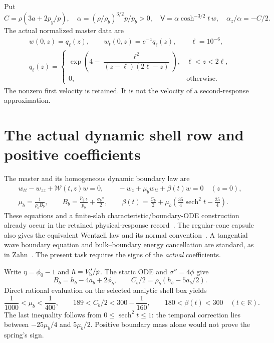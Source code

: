 \documentclass[11pt]{article}
\begin{document}
Put
\begin{equation}
 C=\rho(3a+2p_y/p),\quad
 \alpha=(\rho/\rho_b)^{3/2}p/p_b>0,\quad
 \mathsf V=\alpha\cosh^{-3/2}t\,w,\quad \alpha_z/\alpha=-C/2.
\end{equation}
The actual normalized master data are
\begin{equation}
\begin{gathered}
 w(0,z)=q_\ell(z),\qquad w_t(0,z)=e^{-z}q_\ell(z),\qquad\ell=10^{-6},\\
 q_\ell(z)=
 \begin{cases}
 \exp\!\left(4-\dfrac{\ell^2}{(z-\ell)(2\ell-z)}\right),
                                  &\ell<z<2\ell,\\
 0,&\text{otherwise}.
 \end{cases}
\end{gathered}
\label{eq:packet}
\end{equation}
The nonzero first velocity is retained. It is not the velocity of a
second-response approximation.

\section{The actual dynamic shell row and positive coefficients}
The master and its homogeneous dynamic boundary law are
\begin{equation}
\begin{gathered}
 w_{tt}-w_{zz}+\mathcal W(t,z)w=0,\qquad
 -w_z+\mu_b w_{tt}+\beta(t)w=0\quad(z=0),\\
 \mu_b=\frac1{\rho_b B_b},\qquad
 B_b=\frac{p_{y,b}}{p_b}+\frac{\sigma_b''}{2},\qquad
 \beta(t)=\frac{C_b}{2}
       +\mu_b\left(\frac{35}{4}\operatorname{sech}^2t-\frac{25}{4}\right).
\end{gathered}
\label{eq:boundary}
\end{equation}
These equations and a finite-slab characteristic/boundary-ODE construction
already occur in the retained physical-response record~\cite{response}.
The regular-cone capsule also gives the equivalent Wentzell law and its
normal convention~\cite{cone}. A tangential wave boundary equation and
bulk--boundary energy cancellation are standard, as in Zahn~\cite{zahn}.
The present task requires the signs of the \emph{actual} coefficients.

Write $\eta=\phi_0-1$ and $h=V_{\rm b}'/p$.
The static ODE and $\sigma''=4\phi$ give
\begin{equation}
 B_b=h_b-4a_b+2\phi_b,\qquad C_b/2=\rho_b(h_b-5a_b/2).
\end{equation}
Direct rational evaluation on the selected analytic shell box yields
\begin{equation}
 \frac1{1000}<\mu_b<\frac1{400},\qquad
 189<C_b/2<300-\frac1{160},\qquad
 180<\beta(t)<300\quad(t\in\mathbb R).
 \label{eq:shellcaps}
\end{equation}
The last inequality follows from $0\le\operatorname{sech}^2t\le1$:
the temporal correction lies between $-25\mu_b/4$ and $5\mu_b/2$.
Positive boundary mass alone would not prove the spring's sign.
\end{document}

